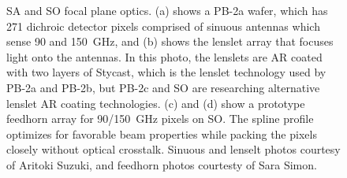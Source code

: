 \begin{figure}[!t]
    \centering
    \hfill
    \caption[Simons Array and Simons Observatory focal plane optics]{SA and SO focal plane optics. (a) shows a PB-2a wafer, which has 271 dichroic detector pixels comprised of sinuous antennas which sense 90 and 150~GHz, and (b) shows the lenslet array that focuses light onto the antennas. In this photo, the lenslets are AR coated with two layers of Stycast, which is the lenslet technology used by PB-2a and PB-2b, but PB-2c and SO are researching alternative lenslet AR coating technologies. (c) and (d) show a prototype feedhorn array for 90/150~GHz pixels on SO. The spline profile optimizes for favorable beam properties while packing the pixels closely without optical crosstalk. Sinuous and lenselt photos courtesy of Aritoki Suzuki, and feedhorn photos courtesty of Sara Simon.}
    \label{fig:focal_plane_optics}
\end{figure}

